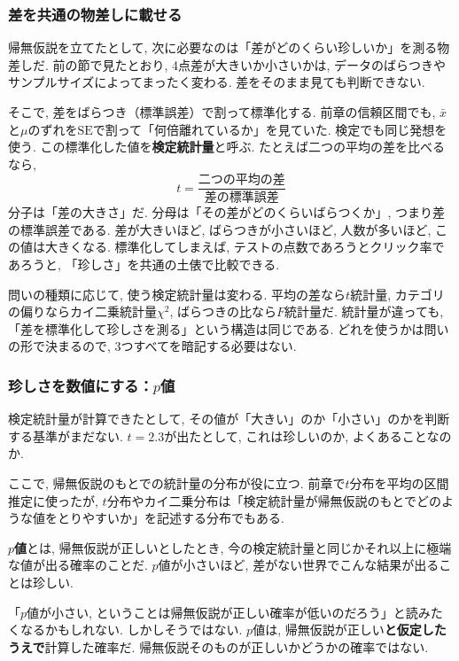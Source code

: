     \subsubsection*{差を共通の物差しに載せる}

    帰無仮説を立てたとして, 次に必要なのは「差がどのくらい珍しいか」を測る物差しだ.
    前の節で見たとおり, 4点差が大きいか小さいかは, データのばらつきやサンプルサイズによってまったく変わる.
    差をそのまま見ても判断できない.

    そこで, 差をばらつき（標準誤差）で割って標準化する.
    前章の信頼区間でも, $\bar{x}$と$\mu$のずれを$\mathrm{SE}$で割って「何倍離れているか」を見ていた.
    検定でも同じ発想を使う.
    この標準化した値を\textbf{検定統計量}と呼ぶ.
    たとえば二つの平均の差を比べるなら,
    \[
      t = \frac{\text{二つの平均の差}}{\text{差の標準誤差}}
    \]
    分子は「差の大きさ」だ.
    分母は「その差がどのくらいばらつくか」, つまり差の標準誤差である.
    差が大きいほど, ばらつきが小さいほど, 人数が多いほど, この値は大きくなる.
    標準化してしまえば, テストの点数であろうとクリック率であろうと, 「珍しさ」を共通の土俵で比較できる.

    問いの種類に応じて, 使う検定統計量は変わる.
    平均の差なら$t$統計量, カテゴリの偏りならカイ二乗統計量$\chi^2$, ばらつきの比なら$F$統計量だ.
    統計量が違っても, 「差を標準化して珍しさを測る」という構造は同じである.
    どれを使うかは問いの形で決まるので, 3つすべてを暗記する必要はない.

    \subsubsection*{珍しさを数値にする：$p$値}

    検定統計量が計算できたとして, その値が「大きい」のか「小さい」のかを判断する基準がまだない.
    $t = 2.3$が出たとして, これは珍しいのか, よくあることなのか.

    ここで, 帰無仮説のもとでの統計量の分布が役に立つ.
    前章で$t$分布を平均の区間推定に使ったが, $t$分布やカイ二乗分布は「検定統計量が帰無仮説のもとでどのような値をとりやすいか」を記述する分布でもある.

    \textbf{$p$値}とは, 帰無仮説が正しいとしたとき, 今の検定統計量と同じかそれ以上に極端な値が出る確率のことだ.
    $p$値が小さいほど, 差がない世界でこんな結果が出ることは珍しい.

    「$p$値が小さい, ということは帰無仮説が正しい確率が低いのだろう」と読みたくなるかもしれない.
    しかしそうではない.
    $p$値は, 帰無仮説が正しい\textbf{と仮定したうえで}計算した確率だ.
    帰無仮説そのものが正しいかどうかの確率ではない.

